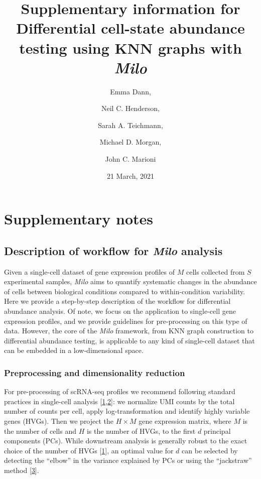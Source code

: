 \documentclass[
]{article}
\title{Supplementary information for
\textbf{Differential cell-state abundance testing using KNN graphs with \emph{Milo}}}
\author{Emma Dann, \and Neil C. Henderson, \and Sarah A. Teichmann, \and Michael D. Morgan, \and John C. Marioni}
\date{21 March, 2021}
\begin{document}
\maketitle

{
\setcounter{tocdepth}{3}
\tableofcontents
}
\renewcommand{\figurename}{Supplementary Figure}

\newpage

\hypertarget{supplementary-notes}{%
\section{Supplementary notes}\label{supplementary-notes}}

\hypertarget{description-of-workflow-for-milo-analysis}{%
\subsection{\texorpdfstring{Description of workflow for \emph{Milo} analysis}{Description of workflow for Milo analysis}}\label{description-of-workflow-for-milo-analysis}}

Given a single-cell dataset of gene expression profiles of \(M\) cells collected from \(S\) experimental samples, \emph{Milo} aims to quantify systematic changes in the abundance of cells between biological conditions compared to within-condition variability. Here we provide a step-by-step description of the workflow for differential abundance analysis. Of note, we focus on the application to single-cell gene expression profiles, and we provide guidelines for pre-processing on this type of data. However, the core of the \emph{Milo} framework, from KNN graph construction to differential abundance testing, is applicable to any kind of single-cell dataset that can be embedded in a low-dimensional space.

\hypertarget{pp}{%
\subsubsection{Preprocessing and dimensionality reduction}\label{pp}}

For pre-processing of scRNA-seq profiles we recommend following standard practices in single-cell analysis {[}\protect\hyperlink{ref-lueckenCurrentBestPractices2019}{1},\protect\hyperlink{ref-amezquitaOrchestratingSinglecellAnalysis2020}{2}{]}: we normalize UMI counts by the total number of counts per cell, apply log-transformation and identify highly variable genes (HVGs). Then we project the \(H \times M\) gene expression matrix, where \(M\) is the number of cells and \(H\) is the number of HVGs, to the first \(d\) principal components (PCs). While downstream analysis is generally robust to the exact choice of the number of HVGs {[}\protect\hyperlink{ref-lueckenCurrentBestPractices2019}{1}{]}, an optimal value for \(d\) can be selected by detecting the ``elbow'' in the variance explained by PCs or using the ``jackstraw'' method {[}\protect\hyperlink{ref-chungStatisticalSignificanceVariables2015}{3}{]}.
\end{document}
